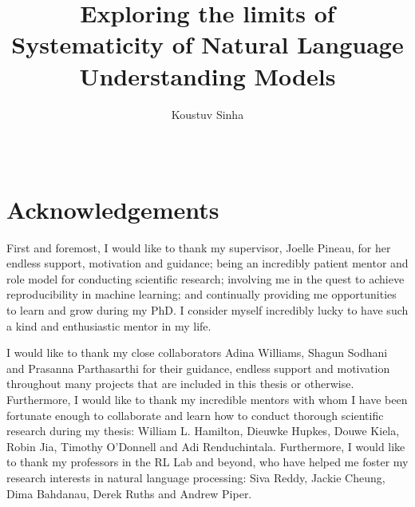 \documentclass[letterpaper, 12pt]{report}
\begin{document}

\title{Exploring the limits of Systematicity of Natural Language Understanding Models}
\author{Koustuv Sinha}
\date{\Month\ \number\year}

\maketitle
\raggedbottom
{}%
{}

\chapter*{Acknowledgements}
\label{chap:ack}

First and foremost, I would like to thank my supervisor, Joelle Pineau, for her endless support, motivation and guidance; being an incredibly patient mentor and role model for conducting scientific research; involving me in the quest to achieve reproducibility in machine learning; and continually providing me opportunities to learn and grow during my PhD. I consider myself incredibly lucky to have such a kind and enthusiastic mentor in my life.

I would like to thank my close collaborators Adina Williams, Shagun Sodhani and Prasanna Parthasarthi for their guidance, endless support and motivation throughout many projects that are included in this thesis or otherwise. Furthermore, I would like to thank my incredible mentors with whom I have been fortunate enough to collaborate and learn how to conduct thorough scientific research during my thesis: William L. Hamilton, Dieuwke Hupkes, Douwe Kiela, Robin Jia, Timothy O'Donnell and Adi Renduchintala. Furthermore, I would like to thank my professors in the RL Lab and beyond, who have helped me foster my research interests in natural language processing: Siva Reddy, Jackie Cheung, Dima Bahdanau, Derek Ruths and Andrew Piper.
\end{document}
